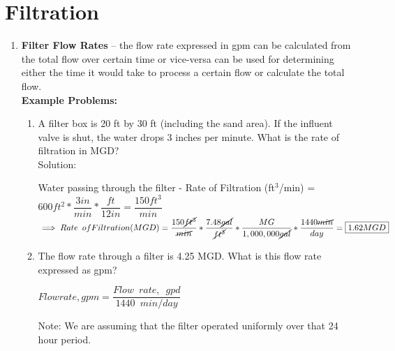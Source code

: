 \section{Filtration}
\begin{enumerate}
\item \textbf{Filter Flow Rates} – the flow rate expressed in gpm can be calculated from the total flow over certain time or vice-versa can be used for determining either the time it would take to process a certain flow or calculate the total flow.\\

 

\textbf{Example Problems:}\\
\begin{enumerate}[1.]
\item A filter box is 20 ft by 30 ft (including the sand area). If the influent valve is shut, the water drops 3 inches per minute. What is the rate of filtration in MGD?\\
\vspace{0.2cm}
Solution:\\
\vspace{0.2cm}

Water passing through the filter - Rate of Filtration (ft$^3$/min) = $600ft^2*\dfrac{3in}{min}*\dfrac{ft}{12in}=\dfrac{150ft^3}{min}$\\
\vspace{0.2cm}
$\implies Rate \enspace of Filtration(MGD)=\dfrac{150\cancel{ft^3}}{\cancel{min}}*\dfrac{7.48\cancel{gal}}{\cancel{ft^3}}*\dfrac{MG}{1,000,000\cancel{gal}}*\dfrac{1440\cancel{min}}{day}=\boxed{1.62MGD}$\\
\vspace{0.2cm}
\item The flow rate through a filter is 4.25 MGD. What is this flow rate expressed as gpm?\\

\vspace{0.2cm}

$Flow rate, gpm=\dfrac{Flow \enspace rate, \enspace gpd}{1440 \enspace min/day}$\\

\vspace{0.2cm}

Note:  We are assuming that the filter operated uniformly over that 24 hour period.\\

\vspace{0.3cm}


\end{enumerate}
\end{enumerate}
